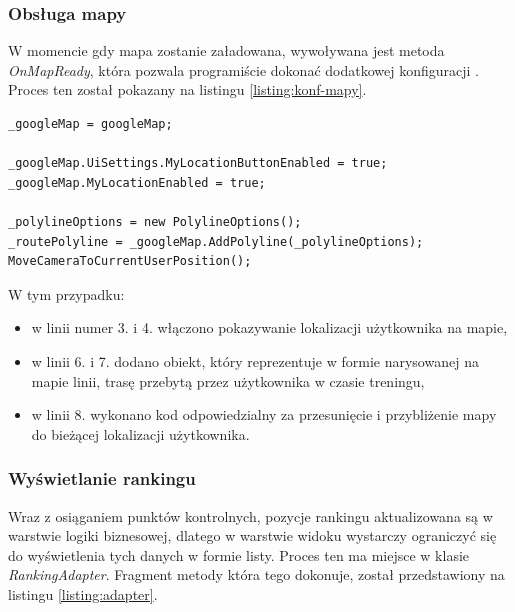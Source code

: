 \subsubsection{Obsługa mapy}
W momencie gdy mapa zostanie załadowana, wywoływana jest metoda \textit{OnMapReady}, która pozwala programiście dokonać dodatkowej konfiguracji \cite{onmapready}. Proces ten został pokazany na listingu \ref{listing:konf-mapy}. 

\begin{lstlisting}[caption={Konfiguracja mapy},label=listing:konf-mapy]
_googleMap = googleMap;

_googleMap.UiSettings.MyLocationButtonEnabled = true;
_googleMap.MyLocationEnabled = true;

_polylineOptions = new PolylineOptions();
_routePolyline = _googleMap.AddPolyline(_polylineOptions);
MoveCameraToCurrentUserPosition();
\end{lstlisting}
W tym przypadku:
\begin{itemize}
\item{w linii numer 3. i 4. włączono pokazywanie lokalizacji użytkownika na mapie},
\item{w linii 6. i 7. dodano obiekt, który reprezentuje w formie narysowanej na mapie linii, trasę przebytą przez użytkownika w czasie treningu},
\item{w linii 8. wykonano kod odpowiedzialny za przesunięcie i przybliżenie mapy do bieżącej lokalizacji użytkownika}.
\end{itemize}
\subsubsection{Wyświetlanie rankingu}
Wraz z osiąganiem punktów kontrolnych, pozycje rankingu aktualizowana są w warstwie logiki biznesowej, dlatego w warstwie widoku wystarczy ograniczyć się do wyświetlenia tych danych w formie listy. Proces ten ma miejsce w klasie \textit{RankingAdapter}. Fragment metody która tego dokonuje, został przedstawiony na listingu \ref{listing:adapter}.

